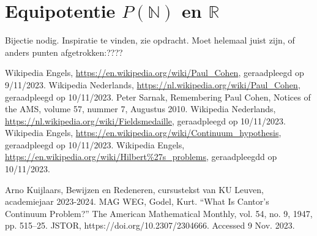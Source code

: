 \documentclass[hidelinks,11pt,a4paper]{article}
\begin{document}
\section{Equipotentie \texorpdfstring{$P(\mathbb{N})$}{} en \texorpdfstring{$\mathbb{R}$}{}}
Bijectie nodig. Inspiratie te vinden, zie opdracht. 
Moet helemaal juist zijn, of anders punten afgetrokken:???? 

\begin{thebibliography}{9}
 Wikipedia Engels, \url{https://en.wikipedia.org/wiki/Paul_Cohen}, geraadpleegd op 9/11/2023. 
 Wikipedia Nederlands, \url{https://nl.wikipedia.org/wiki/Paul_Cohen}, geraadpleegd op 10/11/2023. 
 Peter Sarnak, Remembering Paul Cohen, Notices of the AMS, volume 57, nummer 7, Augustus 2010.
 Wikipedia Nederlands, \url{https://nl.wikipedia.org/wiki/Fieldsmedaille}, geraadpleegd op 10/11/2023. 
 Wikipedia Engels, \url{https://en.wikipedia.org/wiki/Continuum_hypothesis}, geraadpleegd op 10/11/2023. 
 Wikipedia Engels, \url{https://en.wikipedia.org/wiki/Hilbert%27s_problems}, geraadpleegdd op 10/11/2023. 

Arno Kuijlaars, Bewijzen en Redeneren, cursustekst van KU Leuven, academiejaar 2023-2024.
 MAG WEG, Godel, Kurt. “What Is Cantor’s Continuum Problem?” The American Mathematical Monthly, vol. 54, no. 9, 1947, pp. 515–25. JSTOR, https://doi.org/10.2307/2304666. Accessed 9 Nov. 2023.
\end{thebibliography}
\end{document}
